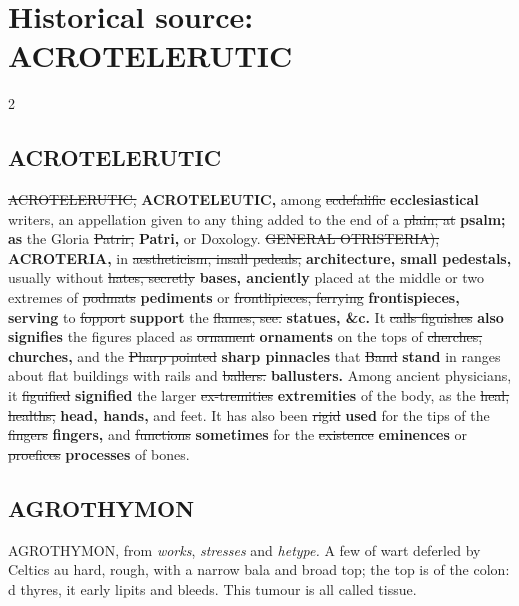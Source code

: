 \documentclass[10pt]{article}
\begin{document}
\section*{Historical source: ACROTELERUTIC}
\begin{multicols}{2}
\subsection*{ACROTELERUTIC}
\sout{ACROTELERUTIC,} \textbf{ACROTELEUTIC,} among \sout{ecdefalific} \textbf{ecclesiastical} writers, an appellation given to any thing added to the end of a \sout{plain; at} \textbf{psalm; as} the Gloria \sout{Patrir,} \textbf{Patri,} or Doxology. \sout{GENERAL OTRISTERIA),} \textbf{ACROTERIA,} in \sout{aestheticism, insall pedeals,} \textbf{architecture, small pedestals,} usually without \sout{hates, secretly} \textbf{bases, anciently} placed at the middle or two extremes of \sout{podmats} \textbf{pediments} or \sout{frontlipieces, ferrying} \textbf{frontispieces, serving} to \sout{fopport} \textbf{support} the \sout{flames, see.} \textbf{statues, \&c.} It \sout{calls figuishes} \textbf{also signifies} the figures placed as \sout{ornament} \textbf{ornaments} on the tops of \sout{cherches,} \textbf{churches,} and the \sout{Pharp pointed} \textbf{sharp pinnacles} that \sout{Band} \textbf{stand} in ranges about flat buildings with rails and \sout{ballers.} \textbf{ballusters.} Among ancient physicians, it \sout{figuified} \textbf{signified} the larger \sout{ex-tremities} \textbf{extremities} of the body, as the \sout{heal, healths,} \textbf{head, hands,} and feet. It has also been \sout{rigid} \textbf{used} for the tips of the \sout{fingers} \textbf{fingers,} and \sout{functions} \textbf{sometimes} for the \sout{existence} \textbf{eminences} or \sout{proefices} \textbf{processes} of bones.

\subsection*{AGROTHYMON}
AGROTHYMON, from \emph{works}, \emph{stresses} and \emph{hetype.} A few of wart deferled by Celtics au hard, rough, with a narrow bala and broad top; the top is of the colon: d thyres, it early lipits and bleeds. This tumour is all called tissue.


\end{multicols}
\end{document}
